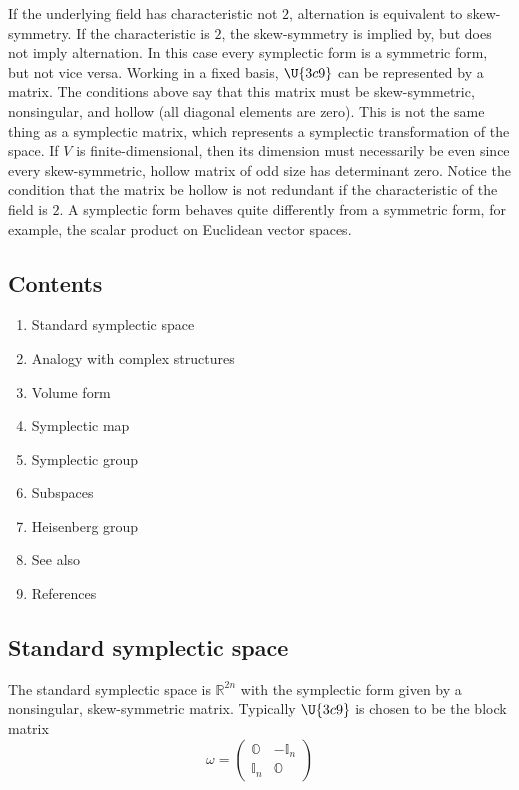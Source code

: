 \documentclass{conm-p-l}
\theoremstyle{definition}
\theoremstyle{remark}
\numberwithin{equation}{section}
\theoremstyle{plain}
\begin{document}
If the underlying field has characteristic not $2$, alternation is
equivalent to skew-symmetry. If the characteristic is $2$, the skew-symmetry
is implied by, but does not imply alternation. In this case every symplectic
form is a symmetric form, but not vice versa. Working in a fixed basis, $%
\U{3c9} $ can be represented by a matrix. The conditions above say that this
matrix must be skew-symmetric, nonsingular, and hollow (all diagonal
elements are zero). This is not the same thing as a symplectic matrix, which
represents a symplectic transformation of the space. If $V$ is
finite-dimensional, then its dimension must necessarily be even since every
skew-symmetric, hollow matrix of odd size has determinant zero. Notice the
condition that the matrix be hollow is not redundant if the characteristic
of the field is $2$. A symplectic form behaves quite differently from a
symmetric form, for example, the scalar product on Euclidean vector spaces.

\subsection{Contents}

\begin{enumerate}
\item Standard symplectic space

\item Analogy with complex structures

\item Volume form

\item Symplectic map

\item Symplectic group

\item Subspaces

\item Heisenberg group

\item See also

\item References
\end{enumerate}

\subsection{Standard symplectic space}

The standard symplectic space is $\mathbb{R}^{2n}$ with the symplectic form
given by a nonsingular, skew-symmetric matrix. Typically $\U{3c9} $ is
chosen to be the block matrix%
\begin{equation}
\omega =\left( 
\begin{array}{cc}
\mathbb{O} & -\mathbb{I}_{n} \\ 
\mathbb{I}_{n} & \mathbb{O}%
\end{array}%
\right) 
\end{equation}
\end{document}
